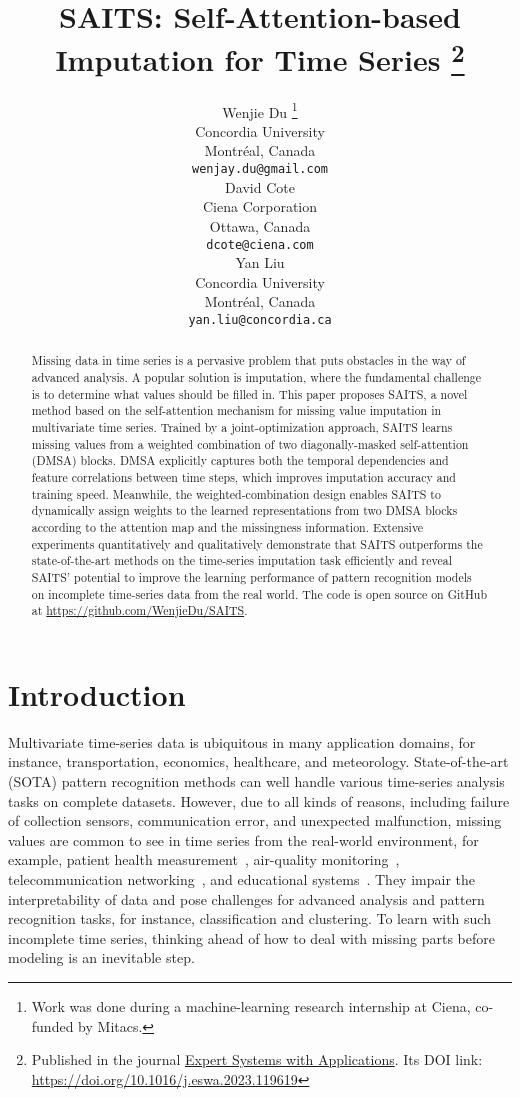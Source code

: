 \documentclass{article}
\title{SAITS: Self-Attention-based Imputation for Time Series \thanks{Published in the journal \href{https://www.sciencedirect.com/journal/expert-systems-with-applications}{Expert Systems with Applications}. Its DOI link: \url{https://doi.org/10.1016/j.eswa.2023.119619}}}
\author{Wenjie Du \thanks{Work was done during a machine-learning research internship at Ciena, co-funded by Mitacs.} \\
	Concordia University \\
	Montr\'eal, Canada \\
	\texttt{wenjay.du@gmail.com} \\
	\And
	David Cote \\
	Ciena Corporation \\
	Ottawa, Canada \\
	\texttt{dcote@ciena.com} \\
	\And
	Yan Liu \\
	Concordia University \\
	Montr\'eal, Canada \\
	\texttt{yan.liu@concordia.ca} \\
}
\begin{document}
\maketitle

\begin{abstract}
Missing data in time series is a pervasive problem that puts obstacles in the way of advanced analysis. A popular solution is imputation, where the fundamental challenge is to determine what values should be filled in. This paper proposes SAITS, a novel method based on the self-attention mechanism for missing value imputation in multivariate time series. Trained by a joint-optimization approach, SAITS learns missing values from a weighted combination of two diagonally-masked self-attention (DMSA) blocks. DMSA explicitly captures both the temporal dependencies and feature correlations between time steps, which improves imputation accuracy and training speed. Meanwhile, the weighted-combination design enables SAITS to dynamically assign weights to the learned representations from two DMSA blocks according to the attention map and the missingness information. Extensive experiments quantitatively and qualitatively demonstrate that SAITS outperforms the state-of-the-art methods on the time-series imputation task efficiently and reveal SAITS' potential to improve the learning performance of pattern recognition models on incomplete time-series data from the real world. The code is open source on GitHub at \url{https://github.com/WenjieDu/SAITS}.
\end{abstract}


\section{Introduction} \label{intro}
Multivariate time-series data is ubiquitous in many application domains, for instance, transportation, economics, healthcare, and meteorology. State-of-the-art (SOTA) pattern recognition methods can well handle various time-series analysis tasks on complete datasets. However, due to all kinds of reasons, including failure of collection sensors, communication error, and unexpected malfunction, missing values are common to see in time series from the real-world environment, for example, patient health measurement~\cite{Silva2012ICU}, air-quality monitoring~\cite{Yi2016STMVL}, telecommunication networking~\cite{du2021ILOS}, and educational systems~\cite{BRUNI2021106512}. They impair the interpretability of data and pose challenges for advanced analysis and pattern recognition tasks, for instance, classification and clustering. To learn with such incomplete time series, thinking ahead of how to deal with missing parts before modeling is an inevitable step.
\end{document}
